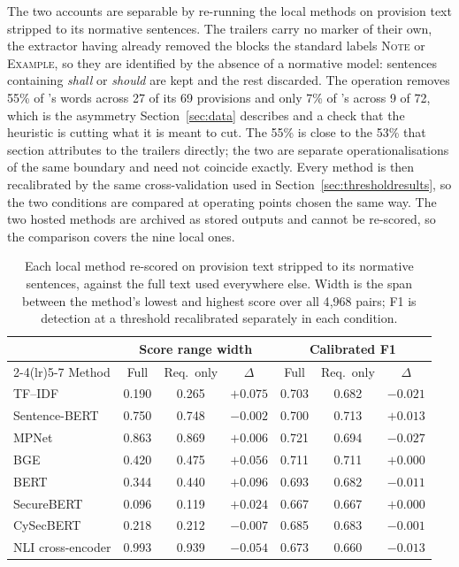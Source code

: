 The two accounts are separable by re-running the local methods on provision text
stripped to its normative sentences. The trailers carry no marker of their own,
the extractor having already removed the blocks the standard labels
\textsc{Note} or \textsc{Example}, so they are identified by the absence of a
normative model: sentences containing \emph{shall} or \emph{should} are kept and
the rest discarded. The operation removes 55\% of \standardA{}'s words across 27
of its 69 provisions and only 7\% of \standardB{}'s across 9 of 72, which is the
asymmetry Section~\ref{sec:data} describes and a check that the heuristic is
cutting what it is meant to cut. The 55\% is close to the 53\% that section
attributes to the trailers directly; the two are separate operationalisations of
the same boundary and need not coincide exactly. Every method is then recalibrated by the same
cross-validation used in Section~\ref{sec:thresholdresults}, so the two conditions
are compared at operating points chosen the same way. The two hosted methods are
archived as stored outputs and cannot be re-scored, so the comparison covers the
nine local ones.

\begin{table}[htbp]
\centering
\caption[Requirement-only ablation]{Each local method re-scored on provision text
stripped to its normative sentences, against the full text used everywhere else.
Width is the span between the method's lowest and highest score over all 4{,}968
pairs; F1 is detection at a threshold recalibrated separately in each condition.}
\label{tab:ablation}
\small
\begin{tabular}{lcccccc}
\toprule
 & \multicolumn{3}{c}{Score range width} & \multicolumn{3}{c}{Calibrated F1}\\
\cmidrule(lr){2-4}\cmidrule(lr){5-7}
Method & Full & Req.\ only & $\Delta$ & Full & Req.\ only & $\Delta$\\
\midrule
TF--IDF            & 0.190 & 0.265 & $+0.075$ & 0.703 & 0.682 & $-0.021$\\
Sentence-BERT      & 0.750 & 0.748 & $-0.002$ & 0.700 & 0.713 & $+0.013$\\
MPNet              & 0.863 & 0.869 & $+0.006$ & 0.721 & 0.694 & $-0.027$\\
BGE                & 0.420 & 0.475 & $+0.056$ & 0.711 & 0.711 & $+0.000$\\
BERT               & 0.344 & 0.440 & $+0.096$ & 0.693 & 0.682 & $-0.011$\\
SecureBERT         & 0.096 & 0.119 & $+0.024$ & 0.667 & 0.667 & $+0.000$\\
CySecBERT          & 0.218 & 0.212 & $-0.007$ & 0.685 & 0.683 & $-0.001$\\
NLI cross-encoder  & 0.993 & 0.939 & $-0.054$ & 0.673 & 0.660 & $-0.013$\\
\bottomrule
\end{tabular}
\end{table}

